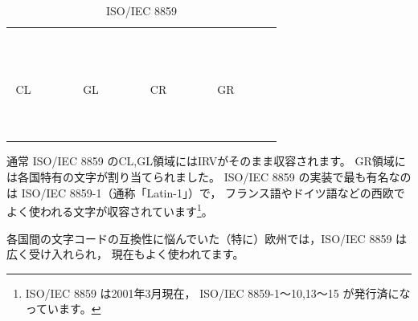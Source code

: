 \documentclass[a4j,10pt,fleqn]{jsarticle}
\begin{document}
\begin{table}[htp]
\begin{center}\begin{tabular}{|cc|cccccc|cc|cccccc|}
    \hline
       &   & \multicolumn{1}{c|}{\footnotesize{~}} &   &   &   &   &   &   &   & \multicolumn{1}{c|}{\footnotesize{~}} &   &   &   &   &   \\ \cline{3-3} \cline{11-11}
     ~ & ~ & ~ & ~ & ~ & ~ & ~ & ~ & ~ & ~ & ~ & ~ & ~ & ~ & ~ & ~ \\
       &   &   &   &   &   &   &   &   &   &   &   &   &   &   &   \\
       &   &   &   &   &   &   &   &   &   &   &   &   &   &   &   \\
       &   &   &   &   &   &   &   &   &   &   &   &   &   &   &   \\
    \multicolumn{2}{|c|}{\footnotesize{CL}} &  \multicolumn{6}{c|}{\footnotesize{GL}} & \multicolumn{2}{c|}{\footnotesize{CR}} & \multicolumn{6}{c|}{\footnotesize{GR}} \\
       &   &   &   &   &   &   &   &   &   &   &   &   &   &   &   \\
       &   &   &   &   &   &   &   &   &   &   &   &   &   &   &   \\
       &   &   &   &   &   &   &   &   &   &   &   &   &   &   &   \\
       &   &   &   &   &   &   &   &   &   &   &   &   &   &   &   \\
       &   &   &   &   &   &   &   &   &   &   &   &   &   &   &   \\  \cline{8-8} \cline{16-16}
       &   &   &   &   &   &   & \multicolumn{1}{|c|}{\footnotesize{~}}  &   &   &   &   &   &   &   & \multicolumn{1}{|c|}{\footnotesize{~}} \\
    \hline
\end{tabular}\end{center}
\caption{ISO/IEC 8859} \label{tbl:ISO8859}
\end{table}

通常 ISO/IEC 8859 のCL,GL領域にはIRVがそのまま収容されます。
GR領域には各国特有の文字が割り当てられました。
ISO/IEC 8859 の実装で最も有名なのは ISO/IEC 8859-1（通称「Latin-1」）で，
フランス語やドイツ語などの西欧でよく使われる文字が収容されています\footnote{
    ISO/IEC 8859 は2001年3月現在，
    ISO/IEC 8859-1～10,13～15 が発行済になっています。
}。

各国間の文字コードの互換性に悩んでいた（特に）欧州では，ISO/IEC 8859 は広く受け入れられ，
現在もよく使われてます。
\end{document}
